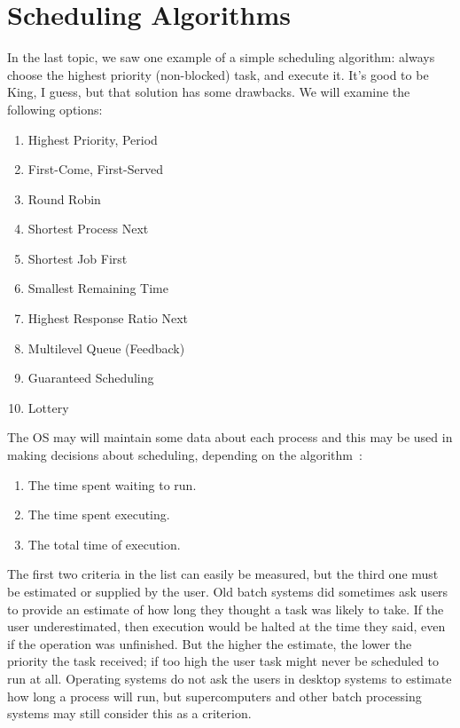 




\section*{Scheduling Algorithms}

In the last topic, we saw one example of a simple scheduling algorithm: always choose the highest priority (non-blocked) task, and execute it. It's good to be King, I guess, but that solution has some drawbacks. We will examine the following options:
\begin{enumerate}
	\item Highest Priority, Period
	\item First-Come, First-Served
	\item Round Robin
	\item Shortest Process Next
	\item Shortest Job First
	\item Smallest Remaining Time
	\item Highest Response Ratio Next
	\item Multilevel Queue (Feedback)
	\item Guaranteed Scheduling
	\item Lottery
\end{enumerate}

The OS may will maintain some data about each process and this may be used in making decisions about scheduling, depending on the algorithm~\cite{osi}:

\begin{enumerate}
	\item The time spent waiting to run.
	\item The time spent executing.
	\item The total time of execution.
\end{enumerate}

The first two criteria in the list can easily be measured, but the third one must be estimated or supplied by the user. Old batch systems did sometimes ask users to provide an estimate of how long they thought a task was likely to take. If the user underestimated, then execution would be halted at the time they said, even if the operation was unfinished. But the higher the estimate, the lower the priority the task received; if too high the user task might never be scheduled to run at all. Operating systems do not ask the users in desktop systems to estimate how long a process will run, but supercomputers and other batch processing systems may still consider this as a criterion.

